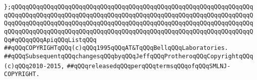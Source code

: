 \verb|};qQQqqQQqqQQqqQQqqQQqqQQqqQQqqQQqqQQqqQQqqQQqqQQqqQQqqQQqqQQqqQQqqQQqqQQqqQQqqQQqqQQqqQQqqQQqqQQqqQQqqQQqqQQqqQQqqQQqqQQqqQQqqQQqqQQqqQQqqQQqqQQqqQQqqQQqqQQqqQQqqQQqqQQqqQQqqQQqqQQqqQQqqQQqqQQqqQQqqQQqqQQqqQQqqQQqqQQqqQQqqQQqqQQqqQQqqQQqqQQqqQQqqQQqqQQqqQQqqQQqqQQqqQQqqQQqqQQqqQQq#qQQqqQQqApiqQQqListqQQq|\newline
\newline
\newline
\newline
\verb|##qQQqCOPYRIGHTqQQq(c)qQQq1995qQQqAT&TqQQqBellqQQqLaboratories.|\newline
\verb|##qQQqSubsequentqQQqchangesqQQqbyqQQqJeffqQQqProtheroqQQqCopyrightqQQq(c)qQQq2010-2015,|\newline
\verb|##qQQqreleasedqQQqperqQQqtermsqQQqofqQQqSMLNJ-COPYRIGHT.|\newline

